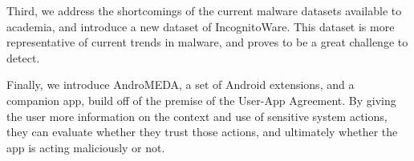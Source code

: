 Third, we address the shortcomings of the current malware datasets available to academia, and introduce a new dataset of IncognitoWare. This dataset is more representative of current trends in malware, and proves to be a great challenge to detect. 

Finally, we introduce AndroMEDA, a set of Android extensions, and a companion app, build off of the premise of the User-App Agreement. By giving the user more information on the context and use of sensitive system actions, they can evaluate whether they trust those actions, and ultimately whether the app is acting maliciously or not.






